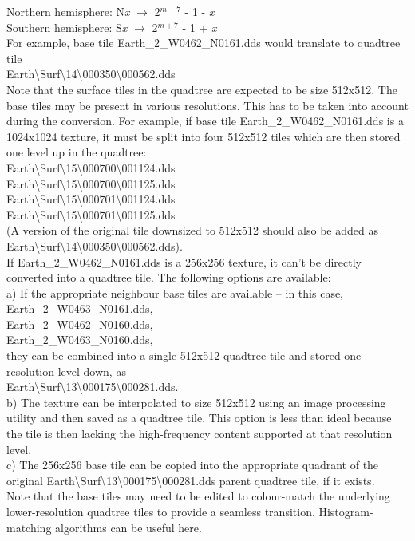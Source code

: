 \documentclass[Orbiter Developer Manual.tex]{subfiles}
\begin{document}
\indent Northern hemisphere: N\textit{x} $\rightarrow$ 2$^{m+7}$ - 1 - \textit{x}\\
\indent Southern hemisphere: S\textit{x} $\rightarrow$ 2$^{m+7}$ - 1 + \textit{x}\\
For example, base tile Earth\_2\_W0462\_N0161.dds would translate to quadtree tile\\
\indent Earth\textbackslash Surf\textbackslash 14\textbackslash 000350\textbackslash 000562.dds\\
Note that the surface tiles in the quadtree are expected to be size 512x512. The base tiles may be present in various resolutions. This has to be taken into account during the conversion. For example, if base tile Earth\_2\_W0462\_N0161.dds is a 1024x1024 texture, it must be split into four 512x512 tiles which are then stored one level up in the quadtree:\\
\indent Earth\textbackslash Surf\textbackslash 15\textbackslash 000700\textbackslash 001124.dds\\
\indent Earth\textbackslash Surf\textbackslash 15\textbackslash 000700\textbackslash 001125.dds\\
\indent Earth\textbackslash Surf\textbackslash 15\textbackslash 000701\textbackslash 001124.dds\\
\indent Earth\textbackslash Surf\textbackslash 15\textbackslash 000701\textbackslash 001125.dds\\
(A version of the original tile downsized to 512x512 should also be added as Earth\textbackslash Surf\textbackslash 14\textbackslash 000350\textbackslash 000562.dds).\\
If Earth\_2\_W0462\_N0161.dds is a 256x256 texture, it can't be directly converted into a quadtree tile. The following options are available:\\
a) If the appropriate neighbour base tiles are available – in this case,\\
\indent Earth\_2\_W0463\_N0161.dds,\\
\indent Earth\_2\_W0462\_N0160.dds,\\
\indent Earth\_2\_W0463\_N0160.dds,\\
they can be combined into a single 512x512 quadtree tile and stored one resolution level down, as\\
\indent Earth\textbackslash Surf\textbackslash 13\textbackslash 000175\textbackslash 000281.dds.\\
b) The texture can be interpolated to size 512x512 using an image processing utility and then saved as a quadtree tile. This option is less than ideal because the tile is then lacking the high-frequency content supported at that resolution level.\\
c) The 256x256 base tile can be copied into the appropriate quadrant of the original Earth\textbackslash Surf\textbackslash 13\textbackslash 000175\textbackslash 000281.dds parent quadtree tile, if it exists.\\
Note that the base tiles may need to be edited to colour-match the underlying lower-resolution quadtree tiles to provide a seamless transition. Histogram-matching algorithms can be useful here.
\end{document}
